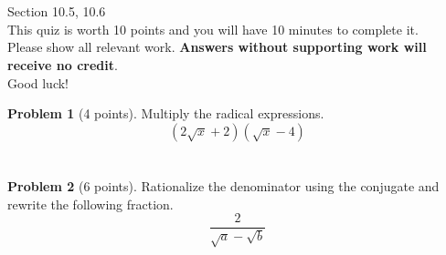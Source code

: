 \documentclass[11pt]{article}
\theoremstyle{definition}
\newtheorem{problem}{Problem}
\begin{document}
\section*{}
Section 10.5, 10.6\\
This quiz is worth 10 points and you will have 10 minutes to complete it.\\
Please show all relevant work. \textbf{Answers without supporting work will receive no credit}.\\
Good luck!


\begin{problem}[4 points] Multiply the radical expressions.
\[(2\sqrt{x}+2)(\sqrt{x}-4)\]

\end{problem}

\vspace{2in}

\section*{}

\begin{problem}[6 points] Rationalize the denominator using the conjugate and rewrite the following fraction.
\[\frac{2}{\sqrt{a}-\sqrt{b}}  \]



\end{problem}
\end{document}
